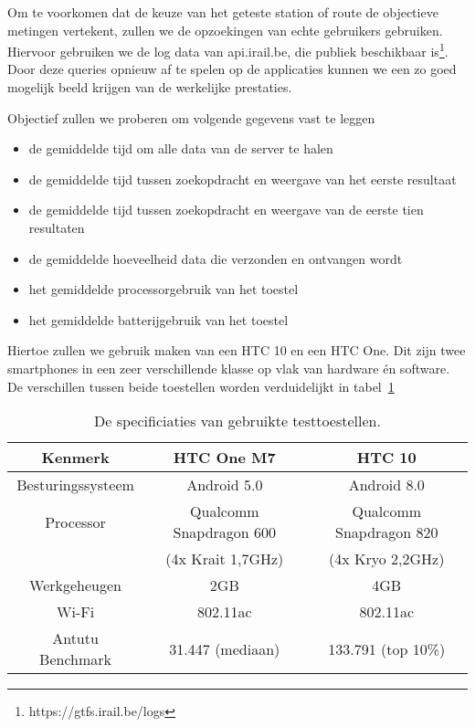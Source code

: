 Om te voorkomen dat de keuze van het geteste station of route de objectieve metingen vertekent, zullen we de opzoekingen van echte gebruikers gebruiken. Hiervoor gebruiken we de log data van api.irail.be, die publiek beschikbaar is\footnote{https://gtfs.irail.be/logs}. Door deze queries opnieuw af te spelen op de applicaties kunnen we een zo goed mogelijk beeld krijgen van de werkelijke prestaties.

Objectief zullen we proberen om volgende gegevens vast te leggen
\begin{itemize}
	\item de gemiddelde tijd om alle data van de server te halen
	\item de gemiddelde tijd tussen zoekopdracht en weergave van het eerste resultaat
	\item de gemiddelde tijd tussen zoekopdracht en weergave van de eerste tien resultaten
	\item de gemiddelde hoeveelheid data die verzonden en ontvangen wordt
	\item het gemiddelde processorgebruik van het toestel
	\item het gemiddelde batterijgebruik van het toestel
\end{itemize}

Hiertoe zullen we gebruik maken van een HTC 10 en een HTC One. Dit zijn twee smartphones in een zeer verschillende klasse op vlak van hardware én software. De verschillen tussen beide toestellen worden verduidelijkt in tabel~\ref{tab:testdevices}
\begin{table}[ht]
	\begin{tabular}{| c | c | c |}
		\hline
		Kenmerk & HTC One M7 & HTC 10 \\
		\hline
		Besturingssysteem & Android 5.0 & Android 8.0 \\
		Processor & Qualcomm Snapdragon 600 & Qualcomm Snapdragon 820\\
		& (4x Krait 1,7GHz) & (4x Kryo 2,2GHz) \\
		Werkgeheugen & 2GB & 4GB \\
		Wi-Fi & 802.11ac & 802.11ac \\
		\hline
		Antutu Benchmark & 31.447 (mediaan)  & 133.791 (top 10\%) \\
		\hline
	\end{tabular}
	\caption[Specificaties van de toestellen gebruikt voor testen]{De specificiaties van gebruikte testtoestellen.}
	\label{tab:testdevices}
\end{table}

